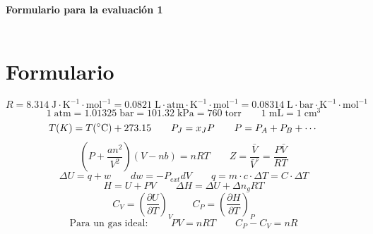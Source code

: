 \documentclass[a4paper,12pt]{article}
\begin{document}

\begin{center}
\HRule \\[0.4cm]
{ \bfseries Formulario para la evaluaci\'on 1}\\ %
\HRule \\[0.4cm]
\end{center}


\section*{Formulario}

$$R=8.314\;\mbox{J}\cdot\mbox{K}^{-1}\cdot\mbox{mol}^{-1}=0.0821\;\mbox{L}\cdot\mbox{atm}\cdot\mbox{K}^{-1}\cdot\mbox{mol}^{-1}=0.08314\;\mbox{L}\cdot\mbox{bar}\cdot\mbox{K}^{-1}\cdot\mbox{mol}^{-1}$$
$$1\;\mbox{atm}=1.01325\;\mbox{bar}=101.32\;\mbox{kPa}=760\;\mbox{torr}\quad\quad 1\;\mbox{mL}=1\;\mbox{cm}^3$$
$$T(K)=T(\celsius)+273.15\quad\quad P_J=x_JP\quad\quad P=P_A+P_B+\cdots$$
$$\left(P+\frac{an^2}{V^2}\right)(V-nb)=nRT \quad\quad Z=\frac{\bar{V}}{\bar{V}^\circ}=\frac{P\bar{V}}{RT}$$
$$\Delta U=q+w\quad\quad dw=-P_{ext}dV\quad\quad q=m\cdot c\cdot\Delta T=C\cdot\Delta T$$
$$H=U+PV\quad\quad \Delta H=\Delta U+\Delta n_g RT$$
$$C_V=\left(\frac{\partial U}{\partial T}\right)_V\quad\quad C_P=\left(\frac{\partial H}{\partial T}\right)_P$$
$$\mbox{Para un gas ideal: }\quad\quad PV=nRT\quad\quad C_P-C_V=nR$$
\end{document}
